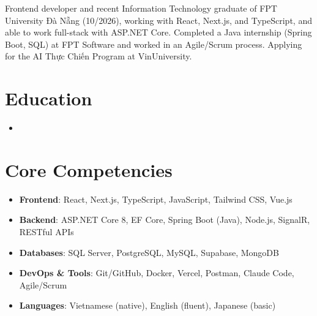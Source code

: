 \documentclass[10pt,a4paper,sans]{moderncv}
\begin{document}
\makecvtitle
\vspace{-22pt}

\small{Frontend developer and recent Information Technology graduate of FPT University Đà Nẵng (10/2026), working with React, Next.js, and TypeScript, and able to work full-stack with ASP.NET Core. Completed a Java internship (Spring Boot, SQL) at FPT Software and worked in an Agile/Scrum process. Applying for the AI Thực Chiến Program at VinUniversity.}

\vspace{-4pt}
\section{Education}
\vspace{1pt}
\begin{itemize}
\item{}
\end{itemize}

\vspace{-4pt}
\section{Core Competencies}
\vspace{1pt}
\begin{itemize}
\item \textbf{Frontend}: React, Next.js, TypeScript, JavaScript, Tailwind CSS, Vue.js
\item \textbf{Backend}: ASP.NET Core 8, EF Core, Spring Boot (Java), Node.js, SignalR, RESTful APIs
\item \textbf{Databases}: SQL Server, PostgreSQL, MySQL, Supabase, MongoDB
\item \textbf{DevOps \& Tools}: Git/GitHub, Docker, Vercel, Postman, Claude Code, Agile/Scrum
\item \textbf{Languages}: Vietnamese (native), English (fluent), Japanese (basic)
\end{itemize}
\end{document}
